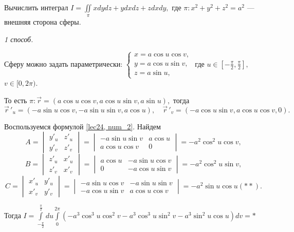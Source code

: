 \documentclass[../../main.tex]{subfiles}
\begin{document}
\begin{example}
	Вычислить интеграл $I = \iint\limits_\pi xdydz + ydxdz + zdxdy,$ где $\pi: x^2 + y^2 + z^2 = a^2$ --- внешняя сторона сферы.
	\smallskip
	
	\emph{1 способ.}
		
	Сферу можно задать параметрически:
	$\begin{cases}	x = a \cos u \cos v,\\
		y = a \cos u \sin v,\\
		z = a \sin u,
	\end{cases} $
	где $u \in [-\frac{\pi}{2}, \frac{\pi}{2}],$ $v \in [0, 2\pi).$
	
	То есть $\pi: \vec{r} = ( a \cos u \cos v,  a \cos u \sin v, a \sin u),$ тогда $$\vec r\,'_u = (-a \sin u \cos v, -a \sin u \sin v, a \cos u),\quad \vec r\,'_v = (-a \cos u \sin v, a \cos u \cos v, 0).$$
	
	Воспользуемся формулой \eqref{lec24, num_2}. Найдем $$A=\begin{vmatrix}
	y'_u & z'_u\\
	y'_v & z'_v
	\end{vmatrix} = \begin{vmatrix}
	-a \sin u \sin v & a \cos u\\
	 a \cos u \cos v & 0
	\end{vmatrix} = -a^2 \cos^2 u \cos v,$$ $$B=\begin{vmatrix}
	z'_u & x'_u\\
	z'_v & x'_v
	\end{vmatrix} = \begin{vmatrix}
	a \cos u & -a \sin u \cos v\\
	0 & -a \cos u \sin v
	\end{vmatrix} = -a^2 \cos^2 u \sin v,$$
	$$C=\begin{vmatrix}
	x'_u & y'_u\\
	x'_v & y'_v
	\end{vmatrix} = \begin{vmatrix}
	-a \sin u \cos v & -a \sin u \sin v\\
	-a \cos u \sin v & a \cos u \cos v
	\end{vmatrix} = -a^2 \sin u \cos u(**).$$
	
	Тогда $I = \int\limits_{-\frac{\pi}{2}}^{\frac{\pi}{2}}du\int\limits_0^{2\pi}(-a^3\cos^3 u \cos^2 v - a^3\cos^3 u \sin^2 v - a^3\sin^2 u \cos u)dv = *$
	

\end{example}
\end{document}
